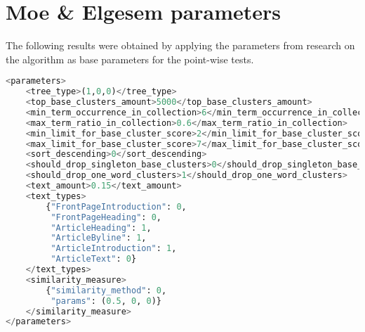 

\section{Moe \& Elgesem parameters}

The following results were obtained by applying the parameters from research on the \CTC algorithm as base parameters for the point-wise tests.

\begin{lstlisting}[float=t, language=python, label=lst:ctcparams, caption={Parameter set used in \CTC algorithm}]
<parameters>
    <tree_type>(1,0,0)</tree_type>
    <top_base_clusters_amount>5000</top_base_clusters_amount>
    <min_term_occurrence_in_collection>6</min_term_occurrence_in_collection>
    <max_term_ratio_in_collection>0.6</max_term_ratio_in_collection>
    <min_limit_for_base_cluster_score>2</min_limit_for_base_cluster_score>
    <max_limit_for_base_cluster_score>7</max_limit_for_base_cluster_score>
    <sort_descending>0</sort_descending>
    <should_drop_singleton_base_clusters>0</should_drop_singleton_base_clusters>
    <should_drop_one_word_clusters>1</should_drop_one_word_clusters>
    <text_amount>0.15</text_amount>
    <text_types>
        {"FrontPageIntroduction": 0,
         "FrontPageHeading": 0,
         "ArticleHeading": 1,
         "ArticleByline": 1,
         "ArticleIntroduction": 1,
         "ArticleText": 0}
    </text_types>
    <similarity_measure>
        {"similarity_method": 0,
         "params": (0.5, 0, 0)}
    </similarity_measure>
</parameters>
\end{lstlisting}

